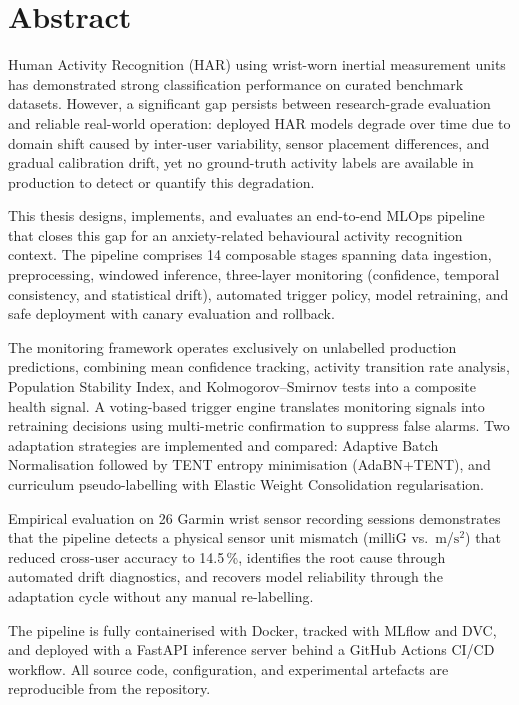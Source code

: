 \chapter*{Abstract}

Human Activity Recognition (HAR) using wrist-worn inertial measurement units
has demonstrated strong classification performance on curated benchmark datasets.
However, a significant gap persists between research-grade evaluation and
reliable real-world operation: deployed HAR models degrade over time due to
domain shift caused by inter-user variability, sensor placement differences,
and gradual calibration drift, yet no ground-truth activity labels are available
in production to detect or quantify this degradation.

This thesis designs, implements, and evaluates an end-to-end MLOps pipeline
that closes this gap for an anxiety-related behavioural activity recognition
context.
The pipeline comprises 14 composable stages spanning data ingestion,
preprocessing, windowed inference, three-layer monitoring (confidence, temporal
consistency, and statistical drift), automated trigger policy, model retraining,
and safe deployment with canary evaluation and rollback.

The monitoring framework operates exclusively on unlabelled production
predictions, combining mean confidence tracking, activity transition rate
analysis, Population Stability Index, and Kolmogorov--Smirnov tests into a
composite health signal.
A voting-based trigger engine translates monitoring signals into retraining
decisions using multi-metric confirmation to suppress false alarms.
Two adaptation strategies are implemented and compared: Adaptive Batch
Normalisation followed by TENT entropy minimisation (AdaBN+TENT), and
curriculum pseudo-labelling with Elastic Weight Consolidation regularisation.

Empirical evaluation on 26 Garmin wrist sensor recording sessions demonstrates
that the pipeline detects a physical sensor unit mismatch (milliG vs.\ m/$\text{s}^2$)
that reduced cross-user accuracy to 14.5\,\%, identifies the root cause through
automated drift diagnostics, and recovers model reliability through the
adaptation cycle without any manual re-labelling.

The pipeline is fully containerised with Docker, tracked with MLflow and DVC,
and deployed with a FastAPI inference server behind a GitHub Actions CI/CD
workflow.
All source code, configuration, and experimental artefacts are reproducible
from the repository.

